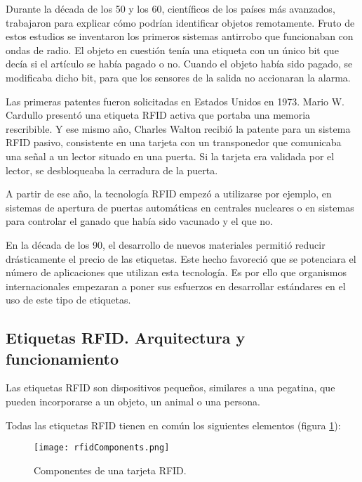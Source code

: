   Durante la década de los 50 y los 60, científicos de los países más
  avanzados, trabajaron para explicar cómo podrían identificar objetos
  remotamente. Fruto de estos estudios se inventaron los primeros sistemas
  antirrobo que funcionaban con ondas de radio. El objeto en cuestión tenía 
  una etiqueta con un único bit que decía si el artículo se había pagado o no.
  Cuando el objeto había sido pagado, se modificaba dicho bit, para que los 
  sensores de la salida no accionaran la alarma.

  Las primeras patentes fueron solicitadas en Estados Unidos en 1973. Mario W.
  Cardullo presentó una etiqueta \acs{RFID} activa que portaba una memoria
  rescribible. Y ese mismo año, Charles Walton recibió la patente para un
  sistema \ac{RFID} pasivo, consistente en una tarjeta con un transponedor que
  comunicaba una señal a un lector situado en una puerta. Si la tarjeta era
  validada por el lector, se desbloqueaba la cerradura de la puerta.

  A partir de ese año, la tecnología \acs{RFID} empezó a utilizarse por ejemplo,
  en sistemas de apertura de puertas automáticas en centrales nucleares o en
  sistemas para controlar el ganado que había sido vacunado y el que no.

  En la década de los 90, el desarrollo de nuevos materiales permitió
  reducir drásticamente el precio de las etiquetas. Este hecho favoreció
  que se potenciara el número de aplicaciones que utilizan esta tecnología.
  Es por ello que organismos internacionales empezaran a poner sus esfuerzos en
  desarrollar estándares en el uso de este tipo de etiquetas.

    \subsection{Etiquetas \acs{RFID}. Arquitectura y funcionamiento}
  Las etiquetas \acs{RFID} son dispositivos pequeños, similares a una pegatina,
  que pueden incorporarse a un objeto, un animal o una persona. 
  
  Todas las etiquetas \acs{RFID} tienen en común los siguientes elementos
  (figura \ref{fig:rfidComponents}):

  \begin{figure}[!h]
    \begin{center}
      \texttt{[image: rfidComponents.png]}
      \caption{Componentes de una tarjeta \acs{RFID}.}
      \label{fig:rfidComponents}
    \end{center}
  \end{figure}

